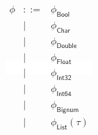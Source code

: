 \documentclass[varwidth]{standalone}
\begin{document}
\setlength{\fboxsep}{10pt}
\colorbox{white}{
  $\displaystyle
  \begin{array}{rcll}
    \phi & ::= & \phi_{\mathsf{Bool}} \\
         & |   & \phi_{\mathsf{Char}} \\
         & |   & \phi_{\mathsf{Double}} \\
         & |   & \phi_{\mathsf{Float}} \\
         & |   & \phi_{\mathsf{Int32}} \\
         & |   & \phi_{\mathsf{Int64}} \\
         & |   & \phi_{\mathsf{Bignum}} \\
         & |   & \phi_{\mathsf{List}}(\tau) \\
  \end{array}
  $
}
\end{document}
